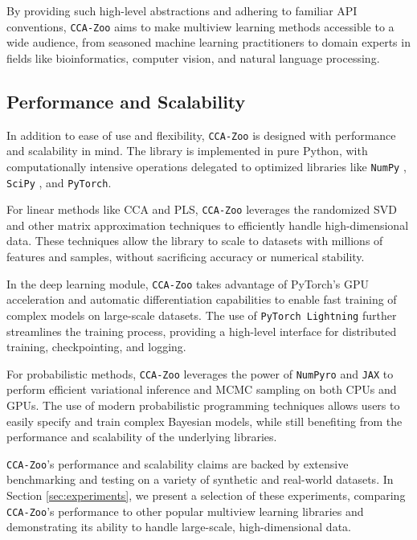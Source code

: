 By providing such high-level abstractions and adhering to familiar API conventions, \texttt{CCA-Zoo} aims to make multiview learning methods accessible to a wide audience, from seasoned machine learning practitioners to domain experts in fields like bioinformatics, computer vision, and natural language processing.

\subsection{Performance and Scalability}

In addition to ease of use and flexibility, \texttt{CCA-Zoo} is designed with performance and scalability in mind. The library is implemented in pure Python, with computationally intensive operations delegated to optimized libraries like \texttt{NumPy} \citep{harris2020array}, \texttt{SciPy} \citep{virtanen2020scipy}, and \texttt{PyTorch}.

For linear methods like CCA and PLS, \texttt{CCA-Zoo} leverages the randomized SVD and other matrix approximation techniques to efficiently handle high-dimensional data. These techniques allow the library to scale to datasets with millions of features and samples, without sacrificing accuracy or numerical stability.

In the deep learning module, \texttt{CCA-Zoo} takes advantage of PyTorch's GPU acceleration and automatic differentiation capabilities to enable fast training of complex models on large-scale datasets. The use of \texttt{PyTorch Lightning} further streamlines the training process, providing a high-level interface for distributed training, checkpointing, and logging.

For probabilistic methods, \texttt{CCA-Zoo} leverages the power of \texttt{NumPyro} and \texttt{JAX} to perform efficient variational inference and MCMC sampling on both CPUs and GPUs. The use of modern probabilistic programming techniques allows users to easily specify and train complex Bayesian models, while still benefiting from the performance and scalability of the underlying libraries.

\texttt{CCA-Zoo}'s performance and scalability claims are backed by extensive benchmarking and testing on a variety of synthetic and real-world datasets. In Section \ref{sec:experiments}, we present a selection of these experiments, comparing \texttt{CCA-Zoo}'s performance to other popular multiview learning libraries and demonstrating its ability to handle large-scale, high-dimensional data.

